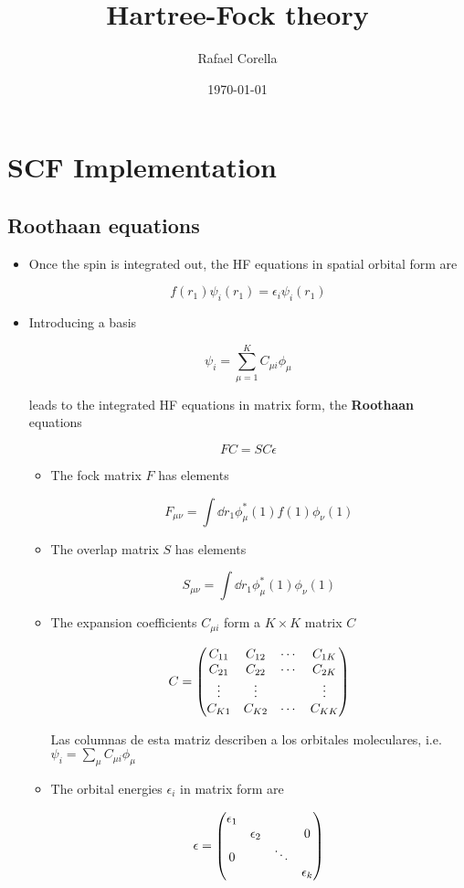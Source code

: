 \documentclass[11pt]{article}
\author{Rafael Corella}
\date{\today}
\title{Hartree-Fock theory}
\begin{document}
\maketitle
\tableofcontents

\section{SCF Implementation}
\label{sec:org4d05cdf}

\subsection{Roothaan equations}
\label{sec:org1db0400}

\begin{itemize}
\item Once the spin is integrated out, the HF equations in spatial orbital form are

\[ f(r_1)\psi_i(r_1) = \epsilon_i\psi_i(r_1) \]

\item Introducing a basis

\[ \psi_i = \sum_{\mu = 1}^K C_{\mu i }\phi_{\mu} \]

leads to the integrated HF equations in matrix form, the \textbf{Roothaan} equations

\[ FC = SC\epsilon \]

\begin{itemize}
\item The fock matrix \(F\) has elements

\[ F_{\mu\nu} = \int \dd{r_1}\phi_{\mu}^{* }(1)f(1) \phi_{\nu}(1) \]

\item The overlap matrix \(S\) has elements

\[ S_{\mu\nu} = \int \dd{r_1} \phi_{\mu}^{ * }(1) \phi_{\nu}(1) \]

\item The expansion coefficients \(C_{\mu i}\) form a \(K\times K\) matrix \(C\)

\[ C = \pmqty{C_{11} & C_{12} & \cdots & C_{1K} \\ C_{21} & C_{22} & \cdots & C_{2K} \\ \vdots & \vdots & & \vdots \\ C_{K1} & C_{K2} & \cdots & C_{KK} } \]

Las columnas de esta matriz describen a los orbitales moleculares, i.e. \(\psi_i = \sum_{\mu}C_{\mu i}\phi_{\mu}\)

\item The orbital energies \(\epsilon_i\) in matrix form are

\[ \epsilon = \pmqty{\epsilon_1 & & & \\ & \epsilon_2 & & 0 \\ 0 & & \ddots  \\ &&& \epsilon_k} \]
\end{itemize}
\end{itemize}
\end{document}
